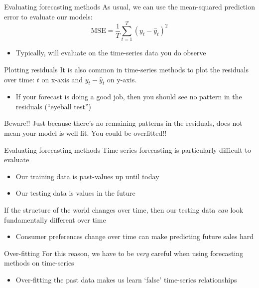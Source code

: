 \documentclass[aspectratio=169,t,11pt,table]{beamer}
\begin{document}
\begin{frame}{Evaluating forecasting methods}
  As usual, we can use the mean-squared prediction error to evaluate our models:
  $$
    \text{MSE} = \frac{1}{T} \sum_{t=1}^T (y_t - \hat{y}_t)^2
  $$

  \begin{itemize}
    \item Typically, will evaluate on the time-series data you do observe
  \end{itemize}
\end{frame}

\begin{frame}{Plotting residuals}
  It is also common in time-series methods to plot the residuals over time:
  $t$ on x-axis and $y_t - \hat{y}_t$ on y-axis.
  \begin{itemize}
    \item If your forecast is doing a good job, then you should see no pattern in the residuals (``eyeball test'')
  \end{itemize}

  \bigskip
  Beware!! Just because there's no remaining patterns in the residuals, does not mean your model is well fit. You could be overfitted!!
\end{frame}

\begin{frame}{Evaluating forecasting methods}
  Time-series forecasting is particularly difficult to evaluate
  \begin{itemize}
    \item Our training data is past-values up until today
    \item Our testing data is values in the future
  \end{itemize}

  \bigskip
  If the structure of the world changes over time, then our testing data \emph{can} look fundamentally different over time
  \begin{itemize}
    \item Consumer preferences change over time can make predicting future sales hard
  \end{itemize}
\end{frame}

\begin{frame}{Over-fitting}
  For this reason, we have to be \emph{very} careful when using forecasting methods on time-series
  \begin{itemize}
    \item Over-fitting the past data makes us learn `false' time-series relationships
  \end{itemize}
\end{frame}
\end{document}
